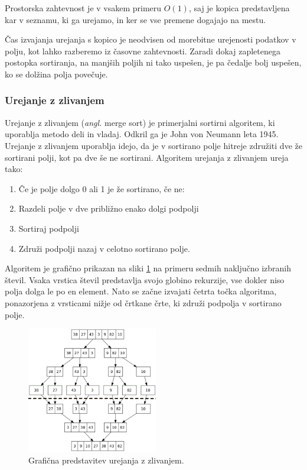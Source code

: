 \documentclass[a4paper,oneside]{article}
\begin{document}
Prostorska zahtevnost je v vsakem primeru $O(1)$, saj je kopica predstavljena kar v
seznamu, ki ga urejamo, in ker se vse premene dogajajo na mestu.

Čas izvajanja urejanja s kopico je neodvisen od morebitne urejenosti podatkov v polju,
kot lahko razberemo iz časovne zahtevnosti. Zaradi dokaj zapletenega postopka sortiranja,
na manjših poljih ni tako uspešen, je pa čedalje bolj uspešen, ko se dolžina polja
povečuje.

\subsubsection{Urejanje z zlivanjem}
Urejanje z zlivanjem (\emph{angl.} merge sort) je primerjalni sortirni algoritem, ki
uporablja metodo deli in vladaj. Odkril ga je John von Neumann leta 1945.
Urejanje z zlivanjem uporablja idejo, da je v sortirano polje hitreje združiti dve že
sortirani polji, kot pa dve še ne sortirani. 
Algoritem urejanja z zlivanjem ureja tako:
\begin{enumerate}
  \item Če je polje dolgo 0 ali 1 je že sortirano, če ne:
  \item Razdeli polje v dve približno enako dolgi podpolji
  \item Sortiraj podpolji 
  \item Združi podpolji nazaj v celotno sortirano polje.
\end{enumerate}

Algoritem je grafično prikazan na sliki \ref{fig:merge-sort-predst} na primeru sedmih
naključno izbranih števil.
Vsaka vrstica števil predstavlja svojo globino rekurzije, vse dokler niso polja dolga le
po en element. Nato se začne izvajati četrta točka algoritma, ponazorjena z vrsticami
nižje od črtkane črte, ki združi podpolja v sortirano polje.

\begin{figure}[h]
    \begin{center}
        \includegraphics[height=55mm]{slike/merge_sort.png}
    \end{center}
    \caption{Grafična predstavitev urejanja z zlivanjem.}
    \label{fig:merge-sort-predst}
\end{figure}
\end{document}
